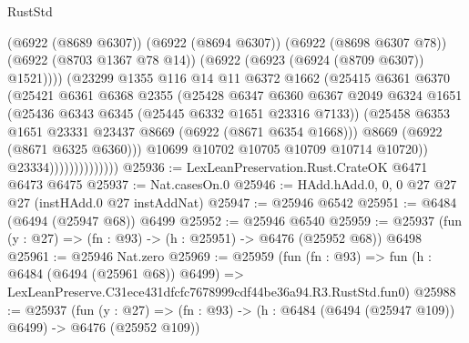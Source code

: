 \begin{lexlean}{RustStd}
\begin{coremodule}
                                  (@6922 (@8689 @6307))
                                  (@6922 (@8694 @6307))
                                  (@6922 (@8698 @6307 @78))
                                  (@6922 (@8703 @1367 @78 @14))
                                  (@6922 (@6923 (@6924 (@8709 @6307)) @1521))))
                              (@23299
                                @1355
                                @116
                                @14
                                @11
                                @6372
                                @1662
                                (@25415
                                  @6361
                                  @6370
                                  (@25421
                                    @6361
                                    @6368
                                    @2355
                                    (@25428
                                      @6347
                                      @6360
                                      @6367
                                      @2049
                                      @6324
                                      @1651
                                      (@25436 @6343 @6345 (@25445 @6332 @1651 @23316 @7133))
                                      (@25458
                                        @6353
                                        @1651
                                        @23331
                                        @23437
                                        @8669
                                        (@6922 (@8671 @6354 @1668)))
                                      @8669
                                      (@6922 (@8671 @6325 @6360)))
                                    @10699
                                    @10702
                                    @10705
                                    @10709
                                    @10714
                                    @10720))
                                @23334))))))))))))))
@25936 := LexLeanPreservation.Rust.CrateOK @6471 @6473 @6475
@25937 := Nat.casesOn.{0}
@25946 := HAdd.hAdd.{0, 0, 0} @27 @27 @27 (instHAdd.{0} @27 instAddNat)
@25947 := @25946 @6542
@25951 := @6484 (@6494 (@25947 @68)) @6499
@25952 := @25946 @6540
@25959 := @25937 (fun (y : @27) => (fn : @93) -> (h : @25951) -> @6476 (@25952 @68)) @6498
@25961 := @25946 Nat.zero
@25969 := @25959
    (fun (fn : @93) =>
    fun (h : @6484 (@6494 (@25961 @68)) @6499) =>
    LexLeanPreserve.C31ece431dfcfc7678999cdf44be36a94.R3.RustStd.fun0)
@25988 := @25937
    (fun (y : @27) => (fn : @93) -> (h : @6484 (@6494 (@25947 @109)) @6499) -> @6476 (@25952 @109))

\end{coremodule}
\end{lexlean}
